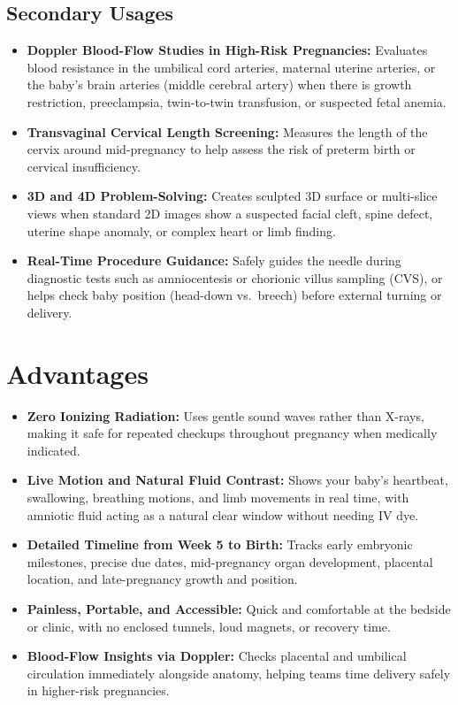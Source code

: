 \subsection{Secondary Usages}
\begin{itemize}
\item \textbf{Doppler Blood-Flow Studies in High-Risk Pregnancies:} Evaluates blood resistance in the umbilical cord arteries, maternal uterine arteries, or the baby's brain arteries (middle cerebral artery) when there is growth restriction, preeclampsia, twin-to-twin transfusion, or suspected fetal anemia.
\item \textbf{Transvaginal Cervical Length Screening:} Measures the length of the cervix around mid-pregnancy to help assess the risk of preterm birth or cervical insufficiency.
\item \textbf{3D and 4D Problem-Solving:} Creates sculpted 3D surface or multi-slice views when standard 2D images show a suspected facial cleft, spine defect, uterine shape anomaly, or complex heart or limb finding.
\item \textbf{Real-Time Procedure Guidance:} Safely guides the needle during diagnostic tests such as amniocentesis or chorionic villus sampling (CVS), or helps check baby position (head-down vs.\ breech) before external turning or delivery.
\end{itemize}

\section{Advantages}
\begin{itemize}
\item \textbf{Zero Ionizing Radiation:} Uses gentle sound waves rather than X-rays, making it safe for repeated checkups throughout pregnancy when medically indicated.
\item \textbf{Live Motion and Natural Fluid Contrast:} Shows your baby's heartbeat, swallowing, breathing motions, and limb movements in real time, with amniotic fluid acting as a natural clear window without needing IV dye.
\item \textbf{Detailed Timeline from Week 5 to Birth:} Tracks early embryonic milestones, precise due dates, mid-pregnancy organ development, placental location, and late-pregnancy growth and position.
\item \textbf{Painless, Portable, and Accessible:} Quick and comfortable at the bedside or clinic, with no enclosed tunnels, loud magnets, or recovery time.
\item \textbf{Blood-Flow Insights via Doppler:} Checks placental and umbilical circulation immediately alongside anatomy, helping teams time delivery safely in higher-risk pregnancies.
\end{itemize}


